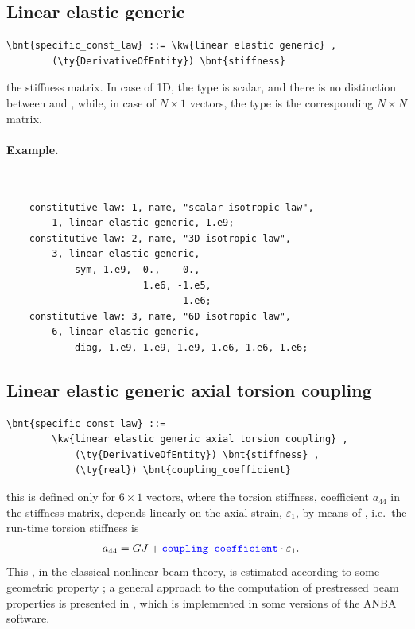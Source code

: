 \subsection{Linear elastic generic}
\begin{Verbatim}[commandchars=\\\{\}]
    \bnt{specific_const_law} ::= \kw{linear elastic generic} ,
        (\ty{DerivativeOfEntity}) \bnt{stiffness}
\end{Verbatim}
the stiffness matrix. In case of 1D, the type is scalar, 
and there is no distinction between  and , 
while, in case of $N \times 1$ vectors, the type is the corresponding 
$N \times N$ matrix.

\paragraph{Example.} \
\begin{verbatim}
    constitutive law: 1, name, "scalar isotropic law",
        1, linear elastic generic, 1.e9;
    constitutive law: 2, name, "3D isotropic law",
        3, linear elastic generic,
            sym, 1.e9,  0.,    0.,
                        1.e6, -1.e5,
                               1.e6;
    constitutive law: 3, name, "6D isotropic law",
        6, linear elastic generic,
            diag, 1.e9, 1.e9, 1.e9, 1.e6, 1.e6, 1.e6;
\end{verbatim}
  

\subsection{Linear elastic generic axial torsion coupling}
\label{sec:ConstitutiveLaw:LINEAR-ELASTIC-GENERIC-AXIAL-TORSION-COUPLING}
\begin{Verbatim}[commandchars=\\\{\}]
    \bnt{specific_const_law} ::= 
        \kw{linear elastic generic axial torsion coupling} ,
            (\ty{DerivativeOfEntity}) \bnt{stiffness} ,
            (\ty{real}) \bnt{coupling_coefficient}
\end{Verbatim}
this is defined only for $6 \times 1$ vectors, where the torsion stiffness,
coefficient $ a_{44} $ in the stiffness matrix, depends linearly on 
the axial strain, $ \varepsilon_1 $, by means of 
, i.e.\ the run-time torsion stiffness is 
\begin{align}
	a_{44}
	&=
	GJ + \textcolor{blue}{\texttt{coupling\_coefficient}} \cdot \varepsilon_1 .
\end{align}
This , in the classical nonlinear beam theory,
is estimated according to some geometric property \cite{HOUBOLT-BROOKS-1957};
a general approach to the computation of prestressed beam properties
is presented in \cite{BORRI-MERLINI}, which is implemented in some versions
of the ANBA software.


